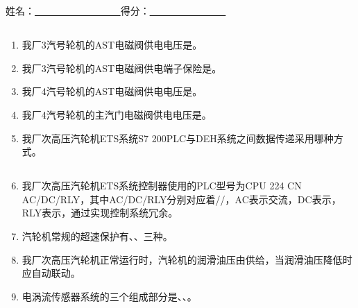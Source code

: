 \documentclass{book}
\begin{document}
		\else						%
		\fi						%
\chapter[2024年04月份技术培训考试]{	\hspace*{-0.3em}}
姓名：\uline{ \ \  \  \ \ \ \ \ \ \ \ \ \ \ \ \ \ }\hfill 得分：\uline{ \ \  \  \ \ \ \ \ \  \ \ \ \ \ \ }
\section{}
\begin{enumerate}
\item 我厂3汽号轮机的AST电磁阀供电电压是。
\item 我厂3汽号轮机的AST电磁阀供电端子保险是。
\item 我厂4汽号轮机的AST电磁阀供电电压是。
\item 我厂4汽号轮机的主汽门电磁阀供电电压是。
\item 我厂次高压汽轮机ETS系统S7 200PLC与DEH系统之间数据传递采用哪种方式。
\end{enumerate}
\section{}
\begin{enumerate}
	\setcounter{enumi}{5}
	\item 我厂次高压汽轮机ETS系统控制器使用的PLC型号为CPU 224 CN AC/DC/RLY，其中AC/DC/RLY分别对应着//，AC表示交流，DC表示，RLY表示，通过实现控制系统冗余。
\item 汽轮机常规的超速保护有、、三种。
\item 我厂次高压汽轮机正常运行时，汽轮机的润滑油压由供给，当润滑油压降低时应自动联动。
\item 电涡流传感器系统的三个组成部分是、、。
\end{enumerate}
\end{document}
